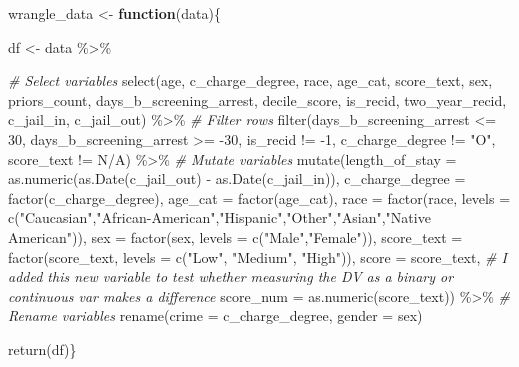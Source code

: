 \documentclass[
]{book}
\newenvironment{Shaded}{\begin{snugshade}}{\end{snugshade}}
\newcommand{\AttributeTok}[1]{\textcolor[rgb]{0.77,0.63,0.00}{#1}}
\newcommand{\CommentTok}[1]{\textcolor[rgb]{0.56,0.35,0.01}{\textit{#1}}}
\newcommand{\ControlFlowTok}[1]{\textcolor[rgb]{0.13,0.29,0.53}{\textbf{#1}}}
\newcommand{\DecValTok}[1]{\textcolor[rgb]{0.00,0.00,0.81}{#1}}
\newcommand{\FunctionTok}[1]{\textcolor[rgb]{0.00,0.00,0.00}{#1}}
\newcommand{\NormalTok}[1]{#1}
\newcommand{\OtherTok}[1]{\textcolor[rgb]{0.56,0.35,0.01}{#1}}
\newcommand{\SpecialCharTok}[1]{\textcolor[rgb]{0.00,0.00,0.00}{#1}}
\newcommand{\StringTok}[1]{\textcolor[rgb]{0.31,0.60,0.02}{#1}}
\begin{document}
\begin{Shaded}
\begin{Highlighting}[]
\NormalTok{wrangle\_data }\OtherTok{\textless{}{-}} \ControlFlowTok{function}\NormalTok{(data)\{}

\NormalTok{df }\OtherTok{\textless{}{-}}\NormalTok{ data }\SpecialCharTok{\%\textgreater{}\%} 
    
    \CommentTok{\# Select variables }
    \FunctionTok{select}\NormalTok{(age, c\_charge\_degree, race, age\_cat, score\_text, sex, priors\_count, days\_b\_screening\_arrest, decile\_score, is\_recid, two\_year\_recid, }
\NormalTok{         c\_jail\_in, c\_jail\_out) }\SpecialCharTok{\%\textgreater{}\%} 
    \CommentTok{\# Filter rows }
    \FunctionTok{filter}\NormalTok{(days\_b\_screening\_arrest }\SpecialCharTok{\textless{}=} \DecValTok{30}\NormalTok{,}
\NormalTok{           days\_b\_screening\_arrest }\SpecialCharTok{\textgreater{}=} \SpecialCharTok{{-}}\DecValTok{30}\NormalTok{, }
\NormalTok{           is\_recid }\SpecialCharTok{!=} \SpecialCharTok{{-}}\DecValTok{1}\NormalTok{,}
\NormalTok{           c\_charge\_degree }\SpecialCharTok{!=} \StringTok{"O"}\NormalTok{,}
\NormalTok{           score\_text }\SpecialCharTok{!=} \StringTok{\textquotesingle{}N/A\textquotesingle{}}\NormalTok{) }\SpecialCharTok{\%\textgreater{}\%} 
    \CommentTok{\# Mutate variables }
    \FunctionTok{mutate}\NormalTok{(}\AttributeTok{length\_of\_stay =} \FunctionTok{as.numeric}\NormalTok{(}\FunctionTok{as.Date}\NormalTok{(c\_jail\_out) }\SpecialCharTok{{-}} \FunctionTok{as.Date}\NormalTok{(c\_jail\_in)),}
           \AttributeTok{c\_charge\_degree =} \FunctionTok{factor}\NormalTok{(c\_charge\_degree),}
           \AttributeTok{age\_cat =} \FunctionTok{factor}\NormalTok{(age\_cat),}
           \AttributeTok{race =} \FunctionTok{factor}\NormalTok{(race, }\AttributeTok{levels =} \FunctionTok{c}\NormalTok{(}\StringTok{"Caucasian"}\NormalTok{,}\StringTok{"African{-}American"}\NormalTok{,}\StringTok{"Hispanic"}\NormalTok{,}\StringTok{"Other"}\NormalTok{,}\StringTok{"Asian"}\NormalTok{,}\StringTok{"Native American"}\NormalTok{)),}
           \AttributeTok{sex =} \FunctionTok{factor}\NormalTok{(sex, }\AttributeTok{levels =} \FunctionTok{c}\NormalTok{(}\StringTok{"Male"}\NormalTok{,}\StringTok{"Female"}\NormalTok{)),}
           \AttributeTok{score\_text =} \FunctionTok{factor}\NormalTok{(score\_text, }\AttributeTok{levels =} \FunctionTok{c}\NormalTok{(}\StringTok{"Low"}\NormalTok{, }\StringTok{"Medium"}\NormalTok{, }\StringTok{"High"}\NormalTok{)),}
           \AttributeTok{score =}\NormalTok{ score\_text,}
\CommentTok{\# I added this new variable to test whether measuring the DV as a binary or continuous var makes a difference }
           \AttributeTok{score\_num =} \FunctionTok{as.numeric}\NormalTok{(score\_text)) }\SpecialCharTok{\%\textgreater{}\%} 
    \CommentTok{\# Rename variables }
    \FunctionTok{rename}\NormalTok{(}\AttributeTok{crime =}\NormalTok{ c\_charge\_degree,}
           \AttributeTok{gender =}\NormalTok{ sex)}
        
\FunctionTok{return}\NormalTok{(df)\}}
\end{Highlighting}
\end{Shaded}
\end{document}
